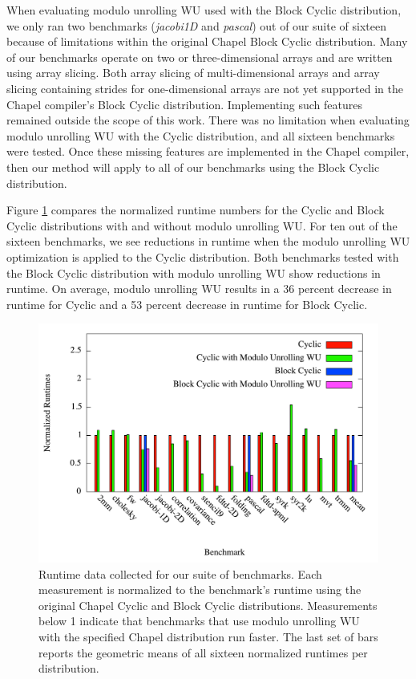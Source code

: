 When evaluating modulo unrolling WU used with the Block Cyclic distribution, we only ran two benchmarks (\textit{jacobi1D} and \textit{pascal}) out of our suite of sixteen because of limitations within the original Chapel Block Cyclic distribution. Many of our benchmarks operate on two or three-dimensional arrays and are written using array slicing. Both array slicing of multi-dimensional arrays and array slicing containing strides for one-dimensional arrays are not yet supported in the Chapel compiler's Block Cyclic distribution. Implementing such features remained outside the scope of this work. There was no limitation when evaluating modulo unrolling WU with the Cyclic distribution, and all sixteen benchmarks were tested. Once these missing features are implemented in the Chapel compiler, then our method will apply to all of our benchmarks using the Block Cyclic distribution.

Figure \ref{runtimes} compares the normalized runtime numbers for the Cyclic and Block Cyclic distributions with and without modulo unrolling WU. For ten out of the sixteen benchmarks, we see reductions in runtime when the modulo unrolling WU optimization is applied to the Cyclic distribution. Both benchmarks tested with the Block Cyclic distribution with modulo unrolling WU show reductions in runtime. On average, modulo unrolling WU results in a 36 percent decrease in runtime for Cyclic and a 53 percent decrease in runtime for Block Cyclic. 

\begin{figure}
\begin{center}
\includegraphics[width=\linewidth]{./Figures/runtimes}
\caption{Runtime data collected for our suite of benchmarks. Each measurement is normalized to the benchmark's runtime using the original Chapel Cyclic and Block Cyclic distributions. Measurements below 1 indicate that benchmarks that use modulo unrolling WU with the specified Chapel distribution run faster. The last set of bars reports the geometric means of all sixteen normalized runtimes per distribution. }
\label{runtimes}
\end{center}
\end{figure}

